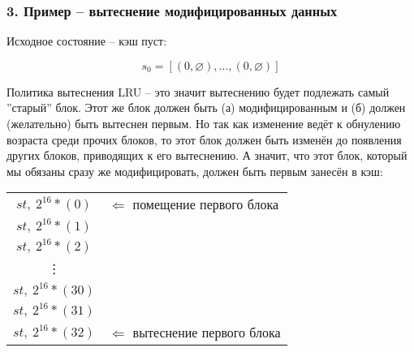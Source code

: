 
\subsubsection*{3. Пример -- вытеснение модифицированных данных}

Исходное состояние -- кэш пуст:

$$s_0 = [(0, \varnothing),...,(0, \varnothing)]$$

Политика вытеснения LRU -- это значит вытеснению будет подлежать самый ''старый'' блок. Этот же блок должен быть (а) модифицированным и (б) должен (желательно) быть вытеснен первым. Но так как изменение ведёт к обнулению возраста среди прочих блоков, то этот блок должен быть изменён до появления других блоков, приводящих к его вытеснению. А значит, что этот блок, который мы обязаны сразу же модифицировать, должен быть первым занесён в кэш:

\begin{table*}
	\centering
	\begin{tabular}{cl}
		$st,~2^{16}*(0)$ & $\Leftarrow$ помещение первого блока \\
		$st,~2^{16}*(1)$ &  \\
		$st,~2^{16}*(2)$ &  \\
		\vdots &  \\
		$st,~2^{16}*(30)$ &  \\
		$st,~2^{16}*(31)$ &  \\
		$st,~2^{16}*(32)$ & $\Leftarrow$ вытеснение первого блока \\
	\end{tabular}
\end{table*}